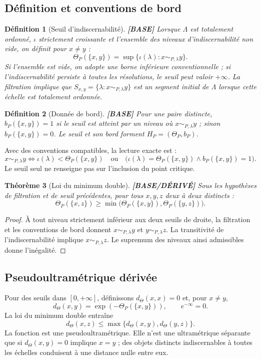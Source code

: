 \documentclass[11pt,a4paper]{article}
\newtheorem{definition}{Définition}[section]
\newtheorem{theorem}[definition]{Théorème}
\theoremstyle{remark}
\newcommand{\Lam}{\Lambda}
\begin{document}
\subsection{Définition et conventions de bord}
\begin{definition}[Seuil d'indiscernabilité] \textbf{[BASE]}
Lorsque $\Lam$ est totalement ordonné, $\iota$ strictement croissante et l'ensemble des niveaux d'indiscernabilité non vide, on définit pour $x\ne y$ :
\[
\boxed{\Theta_P(\{x,y\})=\sup\{\iota(\lambda):x\sim_{P,\lambda}y\}.}
\]
Si l'ensemble est vide, on adopte une borne inférieure conventionnelle ; si l'indiscernabilité persiste à toutes les résolutions, le seuil peut valoir $+\infty$. La filtration implique que $S_{x,y}=\{\lambda:x\sim_{P,\lambda}y\}$ est un segment initial de $\Lam$ lorsque cette échelle est totalement ordonnée.
\end{definition}

\begin{definition}[Donnée de bord] \textbf{[BASE]}
Pour une paire distincte, $b_P(\{x,y\})=1$ si le seuil est atteint par un niveau où $x\sim_{P,\lambda}y$ ; sinon $b_P(\{x,y\})=0$. Le seuil et son bord forment $H_P=(\Theta_P,b_P)$.
\end{definition}

Avec des conventions compatibles, la lecture exacte est :
\[
x\sim_{P,\lambda}y\iff
\iota(\lambda)<\Theta_P(\{x,y\})
\quad\text{ou}\quad
\big(\iota(\lambda)=\Theta_P(\{x,y\})\land b_P(\{x,y\})=1\big).
\]
Le seuil seul ne renseigne pas sur l'inclusion du point critique.

\begin{theorem}[Loi du minimum double] \textbf{[BASE/DÉRIVÉ]}
Sous les hypothèses de filtration et de seuil précédentes, pour tous $x,y,z$ deux à deux distincts :
\[
\boxed{\Theta_P(\{x,z\})\geq\min\big(\Theta_P(\{x,y\}),\Theta_P(\{y,z\})\big).}
\]
\end{theorem}
\begin{proof}
À tout niveau strictement inférieur aux deux seuils de droite, la filtration et les conventions de bord donnent $x\sim_{P,\lambda}y$ et $y\sim_{P,\lambda}z$. La transitivité de l'indiscernabilité implique $x\sim_{P,\lambda}z$. Le supremum des niveaux ainsi admissibles donne l'inégalité.
\end{proof}

\subsection{Pseudoultramétrique dérivée}
Pour des seuils dans $[0,+\infty]$, définissons $d_\Theta(x,x)=0$ et, pour $x\ne y$,
\[
\boxed{d_\Theta(x,y)=\exp(-\Theta_P(\{x,y\})),\qquad e^{-\infty}=0.}
\]
La loi du minimum double entraîne
\[
d_\Theta(x,z)\leq\max\{d_\Theta(x,y),d_\Theta(y,z)\}.
\]
La fonction est une pseudoultramétrique. Elle n'est une ultramétrique séparante que si $d_\Theta(x,y)=0$ implique $x=y$ ; des objets distincts indiscernables à toutes les échelles conduisent à une distance nulle entre eux.
\end{document}

